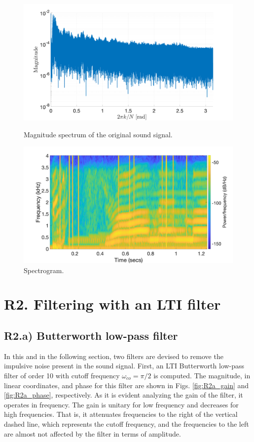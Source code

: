 \documentclass[a4paper, oneside, 11pt]{article}
\begin{document}
\begin{figure}[htbp]
	\centering
	\begin{minipage}[b]{.49\textwidth}
		\centering
		\includegraphics[width= 1.1\textwidth]{figures/R1c.png}
		\caption{Magnitude spectrum of the original sound signal.}
		\label{fig:R1c}
	\end{minipage}
	\hfill
	\begin{minipage}[b]{.49\textwidth}
		\centering
		\includegraphics[width= 1.1\textwidth]{figures/R1c_spectrogram.png}
		\caption{Spectrogram.}
		\label{fig:R1c_spectrogram}
	\end{minipage}
\end{figure}

\section{R2. Filtering with an LTI filter}
\subsection{R2.a) Butterworth low-pass filter}
In this and in the following section, two filters are devised to remove the impulsive noise present in the sound signal. First, an LTI Butterworth low-pass filter of order 10 with cutoff frequency $\omega_{co} = \pi/2$ is computed. The magnitude, in linear coordinates, and phase for this filter are shown in Figs. \ref{fig:R2a_gain} and \ref{fig:R2a_phase}, respectively. As it is evident analyzing the gain of the filter, it operates in frequency. The gain is unitary for low frequency and decreases for high frequencies. That is, it attenuates frequencies to the right of the vertical dashed line, which represents the cutoff frequency, and the frequencies to the left are almost not affected by the filter in terms of amplitude.
\end{document}
